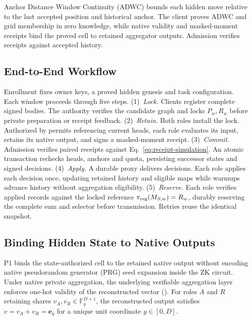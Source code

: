 \documentclass[conference,compsoc]{IEEEtran}
\theoremstyle{definition}
\numberwithin{equation}{section}
\numberwithin{table}{section}
\numberwithin{figure}{section}
\theoremstyle{plain}
\begin{document}
Anchor Distance Window Continuity (ADWC) bounds each hidden move relative to the last accepted position and historical anchor. The client proves ADWC and grid membership in zero knowledge, while native validity and masked-moment receipts bind the proved cell to retained aggregator outputs. Admission verifies receipts against accepted history.

\subsection{End-to-End Workflow}
Enrollment fixes owner keys, a proved hidden genesis and task configuration. Each window proceeds through five steps.
(1)~\emph{Lock.} Clients register complete signed bodies. The authority verifies the candidate graph and locks \(P_w, R_w\) before private preparation or receipt feedback.
(2)~\emph{Retain.} Both roles install the lock. Authorized by permits referencing current heads, each role evaluates its input, retains its native output, and signs a masked-moment receipt.
(3)~\emph{Commit.} Admission verifies paired receipts against Eq.~\eqref{eq:receipt-simulation}. An atomic transaction rechecks heads, anchors and quota, persisting successor states and signed decisions.
(4)~\emph{Apply.} A durable proxy delivers decisions. Each role applies each decision once, updating retained history and eligible maps while warmups advance history without aggregation eligibility.
(5)~\emph{Reserve.} Each role verifies applied records against the locked reference \(\pi_{\rm reg}(M_{S,w}) = R_w\), durably reserving the complete sum and selector before transmission. Retries reuse the identical snapshot.

\subsection{Binding Hidden State to Native Outputs}
\label{sec:native-adaptor}

P1 binds the state-authorized cell to the retained native output without encoding
native pseudorandom generator (PRG) seed expansion inside the ZK circuit. Under native private
aggregation, the underlying verifiable aggregation layer enforces one-hot validity of
the reconstructed vector (\cite[Section~7.4.4]{Barnes2023VDAF08}). For roles $A$ and $R$
retaining shares $v_A, v_R \in \mathbb F_q^{D+1}$, the reconstructed output satisfies
$v = v_A + v_R = \mathbf e_y$ for a unique unit coordinate $y \in [0, D]$.
\end{document}
